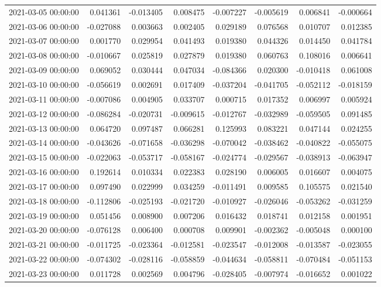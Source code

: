 \begin{tabular}{lrrrrrrr}
2021-03-05 00:00:00 & 0.041361 & -0.013405 & 0.008475 & -0.007227 & -0.005619 & 0.006841 & -0.000664 \\
2021-03-06 00:00:00 & -0.027088 & 0.003663 & 0.002405 & 0.029189 & 0.076568 & 0.010707 & 0.012385 \\
2021-03-07 00:00:00 & 0.001770 & 0.029954 & 0.041493 & 0.019380 & 0.044326 & 0.014450 & 0.041784 \\
2021-03-08 00:00:00 & -0.010667 & 0.025819 & 0.027879 & 0.019380 & 0.060763 & 0.108016 & 0.006641 \\
2021-03-09 00:00:00 & 0.069052 & 0.030444 & 0.047034 & -0.084366 & 0.020300 & -0.010418 & 0.061008 \\
2021-03-10 00:00:00 & -0.056619 & 0.002691 & 0.017409 & -0.037204 & -0.041705 & -0.052112 & -0.018159 \\
2021-03-11 00:00:00 & -0.007086 & 0.004905 & 0.033707 & 0.000715 & 0.017352 & 0.006997 & 0.005924 \\
2021-03-12 00:00:00 & -0.086284 & -0.020731 & -0.009615 & -0.012767 & -0.032989 & -0.059505 & 0.091485 \\
2021-03-13 00:00:00 & 0.064720 & 0.097487 & 0.066281 & 0.125993 & 0.083221 & 0.047144 & 0.024255 \\
2021-03-14 00:00:00 & -0.043626 & -0.071658 & -0.036298 & -0.070042 & -0.038462 & -0.040822 & -0.055075 \\
2021-03-15 00:00:00 & -0.022063 & -0.053717 & -0.058167 & -0.024774 & -0.029567 & -0.038913 & -0.063947 \\
2021-03-16 00:00:00 & 0.192614 & 0.010334 & 0.022383 & 0.028190 & 0.006005 & 0.016607 & 0.004075 \\
2021-03-17 00:00:00 & 0.097490 & 0.022999 & 0.034259 & -0.011491 & 0.009585 & 0.105575 & 0.021540 \\
2021-03-18 00:00:00 & -0.112806 & -0.025193 & -0.021720 & -0.010927 & -0.026046 & -0.053262 & -0.031259 \\
2021-03-19 00:00:00 & 0.051456 & 0.008900 & 0.007206 & 0.016432 & 0.018741 & 0.012158 & 0.001951 \\
2021-03-20 00:00:00 & -0.076128 & 0.006400 & 0.000708 & 0.009901 & -0.002362 & -0.005048 & 0.000100 \\
2021-03-21 00:00:00 & -0.011725 & -0.023364 & -0.012581 & -0.023547 & -0.012008 & -0.013587 & -0.023055 \\
2021-03-22 00:00:00 & -0.074302 & -0.028116 & -0.058859 & -0.044634 & -0.058811 & -0.070484 & -0.051153 \\
2021-03-23 00:00:00 & 0.011728 & 0.002569 & 0.004796 & -0.028405 & -0.007974 & -0.016652 & 0.001022 \\

\end{tabular}
